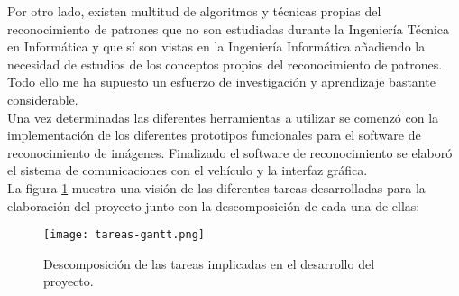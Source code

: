 Por otro lado, existen multitud de algoritmos y técnicas propias del reconocimiento de patrones que no son estudiadas durante la Ingeniería Técnica en Informática y que sí son vistas en la Ingeniería Informática añadiendo la necesidad de estudios de los conceptos propios del reconocimiento de patrones. Todo ello me ha supuesto un esfuerzo de investigación y aprendizaje bastante considerable.\\

Una vez determinadas las diferentes herramientas a utilizar se comenzó con la implementación de los diferentes prototipos funcionales para el software de reconocimiento de imágenes. Finalizado el software de reconocimiento se elaboró el sistema de comunicaciones con el vehículo y la interfaz gráfica.\\

La figura \ref{gantt:tareas} muestra una visión de las diferentes tareas desarrolladas para la elaboración del proyecto junto con la descomposición de cada una de ellas:\\

\begin{figure}[H]
  \begin{center}
    \texttt{[image: tareas-gantt.png]}
  \end{center}
  \caption{Descomposición de las tareas implicadas en el desarrollo del proyecto.}
  \label{gantt:tareas}
\end{figure}




